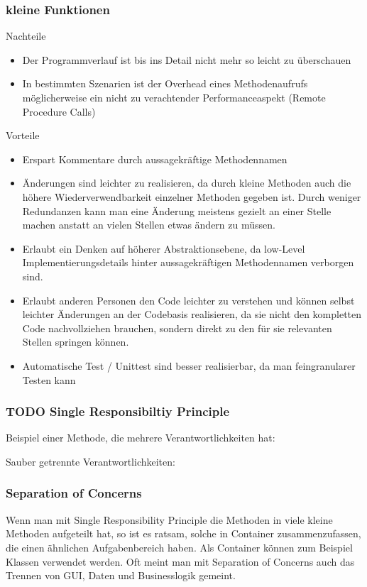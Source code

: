 \documentclass[11pt]{article}
\begin{document}
\subsubsection{kleine Funktionen}
\label{sec:orgheadline8}
Nachteile
\begin{itemize}
\item Der Programmverlauf ist bis ins Detail nicht mehr so leicht zu überschauen
\item In bestimmten Szenarien ist der Overhead eines Methodenaufrufs möglicherweise
ein nicht zu verachtender Performanceaspekt (Remote Procedure Calls)
\end{itemize}
Vorteile
\begin{itemize}
\item Erspart Kommentare durch aussagekräftige Methodennamen
\item Änderungen sind leichter zu realisieren, da durch kleine Methoden auch die
höhere Wiederverwendbarkeit einzelner Methoden gegeben ist. Durch weniger Redundanzen kann man
eine Änderung meistens gezielt an einer Stelle machen anstatt an vielen
Stellen etwas ändern zu müssen.
\item Erlaubt ein Denken auf höherer Abstraktionsebene, da low-Level
Implementierungsdetails hinter aussagekräftigen Methodennamen verborgen sind.
\item Erlaubt anderen Personen den Code leichter zu verstehen und  können selbst
leichter Änderungen an der Codebasis realisieren, da sie nicht den kompletten
Code nachvollziehen brauchen, sondern direkt zu den für sie relevanten Stellen
springen können.
\item Automatische Test / Unittest sind besser realisierbar, da man feingranularer
Testen kann
\end{itemize}

\subsubsection{{\bfseries\sffamily TODO} Single Responsibiltiy Principle}
\label{sec:orgheadline9}
Beispiel einer Methode, die mehrere Verantwortlichkeiten hat:

Sauber getrennte Verantwortlichkeiten:
\subsubsection{Separation of Concerns}
\label{sec:orgheadline10}
Wenn man mit Single Responsibility Principle die Methoden in viele kleine
Methoden aufgeteilt hat, so ist es ratsam, solche in Container
zusammenzufassen, die einen ähnlichen Aufgabenbereich haben.
Als Container können zum Beispiel Klassen verwendet werden.
Oft meint man mit Separation of Concerns auch das Trennen von 
GUI, Daten und Businesslogik gemeint.
\end{document}
